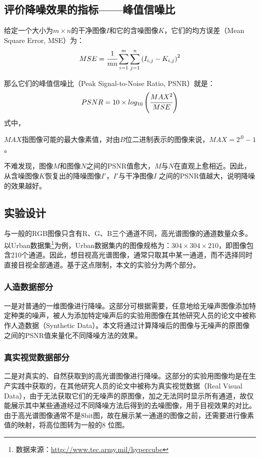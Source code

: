 \documentclass[12pt, a4paper]{article}
\begin{document}
\subsection{评价降噪效果的指标——峰值信噪比}
\par 给定一个大小为$m \times n$的干净图像$I$和它的含噪图像$K$，它们的均方误差（Mean Square Error, MSE）为：
\begin{displaymath}
\centering
MSE = \cfrac{1}{mn}\sum_{i=1}^{m}\sum_{j=1}^{n}\left(I_{i,j}-K_{i, j}\right)^2
\end{displaymath}
\par 那么它们的峰值信噪比（Peak Signal-to-Noise Ratio, PSNR）就是：
\begin{displaymath}
\centering
PSNR = 10 \times log_{10}\left(\cfrac{MAX^2}{MSE}\right)
\end{displaymath}
式中，
\par$MAX$指图像可能的最大像素值，对由$B$位二进制表示的图像来说，$MAX=2^B-1$。
\par 不难发现，图像$M$和图像$N$之间的PSNR值愈大，$M$与$N$在直观上愈相近。因此，从含噪图像$K$恢复出的降噪图像$I'$，$I'$与干净图像$I$ 之间的PSNR值越大，说明降噪的效果越好。
\subsection{实验设计}
\par 与一般的RGB图像只含有R、G、B三个通道不同，高光谱图像的通道数量众多。以Urban数据集\footnote{数据来源：\url{http://www.tec.army.mil/hypercube}}为例，Urban数据集内的图像规格为：$304 \times 304 \times 210$，即图像包含210个通道。因此，想目视高光谱图像，通常只取其中某一通道，而不选择同时直接目视全部通道。基于这点限制，本文的实验分为两个部分。
\subsubsection{人造数据部分}\label{synthetic}
\par 一是对普通的一维图像进行降噪。这部分可根据需要，任意地给无噪声图像添加特定种类的噪声，被人为添加特定噪声后的实验用图像在其他研究人员的论文中被称作人造数据（Synthetic Data）。本文将通过计算降噪后的图像与无噪声的原图像之间的PSNR值来量化不同降噪方法的效果。
\subsubsection{真实视觉数据部分}\label{real}
\par 二是对真实的、自然获取到的高光谱图像进行降噪。这部分的实验用图像均是在生产实践中获取的，在其他研究人员的论文中被称为真实视觉数据（Real Visual Data），由于无法获取它们的无噪声的原图像，加之无法同时显示所有通道，故仅能展示其中某些通道经过不同降噪方法后得到的去噪图像，用于目视效果的对比。由于高光谱图像通常不是8bit图，故在展示某一通道的图像之前，还需要进行像素值的映射，将高位图转为一般的8 位图。
\end{document}
